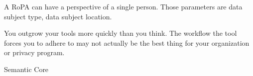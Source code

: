 A RoPA can have a perspective of a single person. Those parameters are data subject type, data subject location.





You outgrow your tools more quickly than you think.  The workflow the tool forces you to adhere to may not actually be the best thing for your organization or privacy program.


Semantic Core


